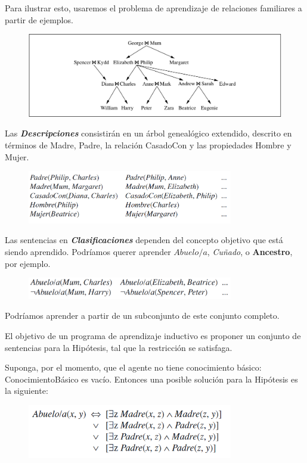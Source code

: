 \documentclass[12 pt, a4paper]{article}
\begin{document}
	 		Para ilustrar esto, usaremos el problema de aprendizaje de relaciones familiares a partir de ejemplos.
	 		\begin{figure}[h]
					\centering
					\includegraphics[width=1\textwidth]{./section3/fig3.png}
				\end{figure}
			Las \textbf{\textit{Descripciones}} consistirán en un árbol genealógico extendido, descrito en términos de Madre, Padre, la relación CasadoCon y las propiedades Hombre y Mujer. 	
				\begin{figure}[h]
					\centering
					\includegraphics[width=0.8\textwidth]{./section3/fig4.png}
				\end{figure}
			Las sentencias en \textbf{\textit{Clasificaciones}} dependen del concepto objetivo que está siendo aprendido. 
Podríamos querer aprender $Abuelo/a$, \textit{Cuñado}, o \textbf{Ancestro}, por ejemplo. 
				\begin{figure}[h]
					\centering
					\includegraphics[width=0.8\textwidth]{./section3/fig5.png}
				\end{figure}
			Podríamos aprender a partir de un subconjunto de este conjunto completo.
	
			El objetivo de un programa de aprendizaje inductivo es proponer un conjunto de sentencias para la Hipótesis, tal que la restricción se satisfaga. 
			
			Suponga, por el momento, que el agente no tiene conocimiento básico: ConocimientoBásico es vacío. Entonces una posible solución para la Hipótesis es la siguiente:
				\begin{figure}[h]
					\centering
					\includegraphics[width=0.8\textwidth]{./section3/fig6.png}
				\end{figure}
				
\end{document}
